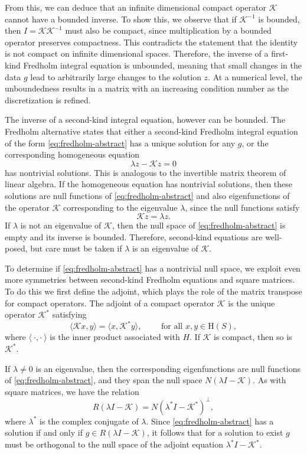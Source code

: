 From this, we can deduce that an infinite dimensional compact operator $\mathcal{K}$ cannot have a bounded inverse. To show this, we observe that if $\mathcal{K}^{-1}$ is bounded, then $I = \mathcal{K}\mathcal{K}^{-1}$ must also be compact, since multiplication by a bounded operator preserves compactness. This contradicts the statement that the identity is not compact on infinite dimensional spaces. Therefore, the inverse of a first-kind Fredholm integral equation is unbounded, meaning that small changes in the data $g$ lead to arbitrarily large changes to the solution $z$. At a numerical level, the unboundedness results in a matrix with an increasing condition number as the discretization is refined. 

The inverse of a second-kind integral equation, however can be bounded. The Fredholm alternative states that either a second-kind Fredholm integral equation of the form \eqref{eq:fredholm-abstract} has a unique solution for any $g$, or the corresponding homogeneous equation
\[ \lambda z- \mathcal{K}z = 0\]
has nontrivial solutions. This is  analogous to the invertible matrix theorem of linear algebra. If the homogeneous equation has nontrivial solutions, then these solutions are null functions of \eqref{eq:fredholm-abstract} and also eigenfunctions of the operator $\mathcal{K}$ corresponding to the eigenvalue $\lambda$, since the null functions satisfy
\[ \mathcal{K}z = \lambda z.\]
If $\lambda$ is not an eigenvalue of $\mathcal{K}$, then the null space of \eqref{eq:fredholm-abstract} is empty and its inverse is bounded. Therefore, second-kind equations are well-posed, but care must be taken if $\lambda$ is an eigenvalue of $\mathcal{K}$. 

To determine if \eqref{eq:fredholm-abstract} has a nontrivial null space, we  exploit even more symmetries between second-kind Fredholm equations and square matrices. To do this we first define the adjoint, which plays the role of the matrix transpose for compact operators. The adjoint of a compact operator $\mathcal{K}$ is the unique operator $\mathcal{K}^*$ satisfying
\[ \langle \mathcal{K}x, y\rangle = \langle x, \mathcal{K}^*y\rangle, \qquad \text{ for all } x,y \in \text{H}(S),\]
where $\langle ~\cdot,\cdot~\rangle$ is the inner product associated with $H$. If $\mathcal{K}$ is compact, then so is $\mathcal{K}^*$. 

If $\lambda\ne 0$ is an eigenvalue, then the corresponding eigenfunctions are null functions of \eqref{eq:fredholm-abstract}, and they span the null space  $N(\lambda I - \mathcal{K})$. As with square matrices, we have the relation
\[ R(\lambda I - \mathcal{K}) = N(\lambda^* I - \mathcal{K}^*)^\perp,\]
where $\lambda^*$ is the complex conjugate of $\lambda$. Since \eqref{eq:fredholm-abstract} has a solution if and only if $g\in R(\lambda I - \mathcal{K})$, it follows that for a solution to exist $g$ must be orthogonal to the null space of the adjoint equation $\lambda^*I - \mathcal{K}^*$. 

